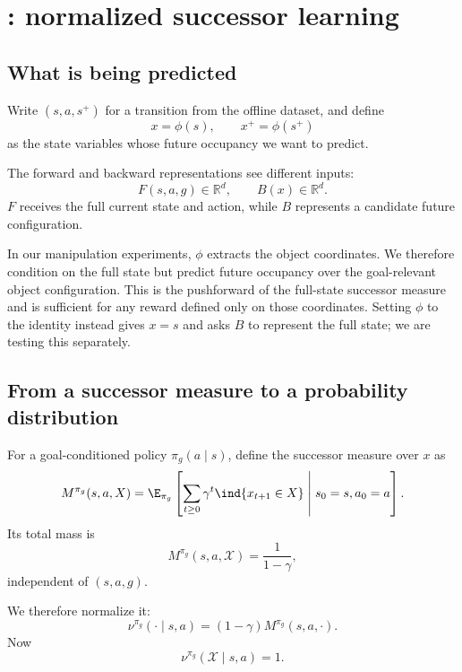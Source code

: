 \section{\DensityFB: normalized successor learning}
\label{sec:method}

\subsection{What is being predicted}

Write \( (s,a,s^+) \) for a transition from the offline dataset, and define
\begin{equation}
x=\phi(s), \qquad x^+=\phi(s^+)
\end{equation}
as the state variables whose future occupancy we want to predict.

The forward and backward representations see different inputs:
\begin{equation}
\label{eq:fb-args}
F(s,a,g)\in\mathbb R^d, \qquad B(x)\in\mathbb R^d.
\end{equation}
$F$ receives the full current state and action, while $B$ represents a candidate future configuration.

In our manipulation experiments, $\phi$ extracts the object coordinates.
We therefore condition on the full state but predict future occupancy over the goal-relevant object configuration.
This is the pushforward of the full-state successor measure and is sufficient for any reward defined only on those coordinates.
Setting $\phi$ to the identity instead gives $x=s$ and asks $B$ to represent the full state; we are testing this separately.

\subsection{From a successor measure to a probability distribution}

For a goal-conditioned policy $\pi_g(a\mid s)$, define the successor measure over $x$ as
\begin{equation}
    M^{\pi_g}(s,a,X) = \E_{\pi_g} \left[ \sum_{t\ge0} \gamma^t \ind{x_{t+1}\in X} \;\middle|\; s_0=s,a_0=a \right].
\end{equation}
Its total mass is
\begin{equation}
    M^{\pi_g}(s,a,\mathcal X) = \frac{1}{1-\gamma},
\end{equation}
independent of $(s,a,g)$.

We therefore normalize it:
\begin{equation}
\label{eq:normalized-sm}
    \nu^{\pi_g}(\cdot\mid s,a) = (1-\gamma) M^{\pi_g}(s,a,\cdot).
\end{equation}
Now
\begin{equation}
\nu^{\pi_g}(\mathcal X\mid s,a)=1.
\end{equation}

